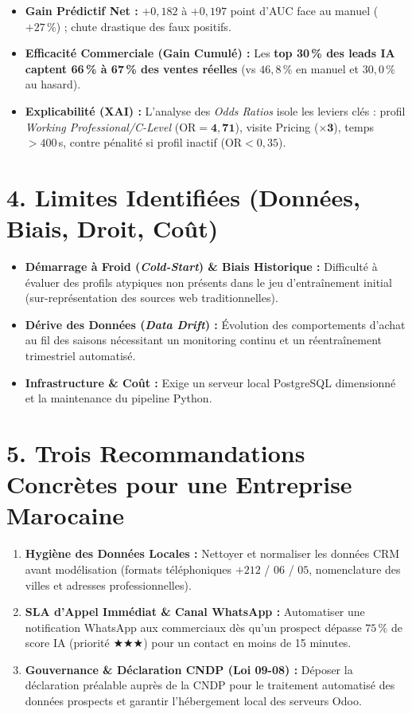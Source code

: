 \documentclass[10pt,a4paper]{article}
\begin{document}
\begin{itemize}
    \item \textbf{Gain Prédictif Net :} $+0,182$ à $+0,197$ point d'AUC face au manuel ($+27\,\%$) ; chute drastique des faux positifs.
    \item \textbf{Efficacité Commerciale (Gain Cumulé) :} Les \textbf{top 30\,\% des leads IA captent 66\,\% à 67\,\% des ventes réelles} (vs $46,8\,\%$ en manuel et $30,0\,\%$ au hasard).
    \item \textbf{Explicabilité (XAI) :} L'analyse des \textit{Odds Ratios} isole les leviers clés : profil \textit{Working Professional/C-Level} ($\text{OR} = \mathbf{4{,}71}$), visite Pricing ($\mathbf{\times 3}$), temps $> 400$\,s, contre pénalité si profil inactif ($\text{OR} < 0{,}35$).
\end{itemize}

\vspace{-0.3em}

\section{4. Limites Identifiées (Données, Biais, Droit, Coût)}
\begin{itemize}
    \item \textbf{Démarrage à Froid (\textit{Cold-Start}) \& Biais Historique :} Difficulté à évaluer des profils atypiques non présents dans le jeu d'entraînement initial (sur-représentation des sources web traditionnelles).
    \item \textbf{Dérive des Données (\textit{Data Drift}) :} Évolution des comportements d'achat au fil des saisons nécessitant un monitoring continu et un réentraînement trimestriel automatisé.
    \item \textbf{Infrastructure \& Coût :} Exige un serveur local PostgreSQL dimensionné et la maintenance du pipeline Python.
\end{itemize}

\vspace{-0.3em}

\section{5. Trois Recommandations Concrètes pour une Entreprise Marocaine}
\begin{enumerate}
    \item \textbf{Hygiène des Données Locales :} Nettoyer et normaliser les données CRM avant modélisation (formats téléphoniques $+212$ / $06$ / $05$, nomenclature des villes et adresses professionnelles).
    \item \textbf{SLA d'Appel Immédiat \& Canal WhatsApp :} Automatiser une notification WhatsApp aux commerciaux dès qu'un prospect dépasse $75\,\%$ de score IA (priorité $\bigstar\bigstar\bigstar$) pour un contact en moins de 15 minutes.
    \item \textbf{Gouvernance \& Déclaration CNDP (Loi 09-08) :} Déposer la déclaration préalable auprès de la CNDP pour le traitement automatisé des données prospects et garantir l'hébergement local des serveurs Odoo.
\end{enumerate}
\end{document}
